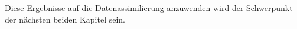 
Diese Ergebnisse auf die Datenassimilierung anzuwenden wird der Schwerpunkt der nächsten beiden Kapitel sein.
